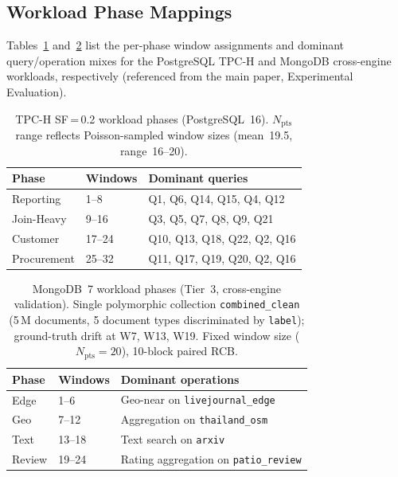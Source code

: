 \documentclass[10pt,twocolumn,a4paper]{article}
\newcommand{\Npts}{N_{\mathrm{pts}}}
\begin{document}
\subsection{Workload Phase Mappings}\label{supp:phases}

Tables~\ref{tab:phases-supp} and~\ref{tab:mongo-phases-supp} list the
per-phase window assignments and dominant query/operation mixes for the
PostgreSQL TPC-H and MongoDB cross-engine workloads, respectively
(referenced from the main paper, Experimental Evaluation).

\begin{table}[!htb]\centering\small
\caption{TPC-H SF\,=\,0.2 workload phases (PostgreSQL~16).
$\Npts$ range reflects Poisson-sampled window sizes
(mean~19.5, range~16--20).}\label{tab:phases-supp}
\begin{tabular}{@{}llp{3.5cm}@{}}
\toprule
\textbf{Phase} & \textbf{Windows} & \textbf{Dominant queries}\\
\midrule
Reporting & 1--8 & Q1, Q6, Q14, Q15, Q4, Q12\\
Join-Heavy & 9--16 & Q3, Q5, Q7, Q8, Q9, Q21\\
Customer & 17--24 & Q10, Q13, Q18, Q22, Q2, Q16\\
Procurement & 25--32 & Q11, Q17, Q19, Q20, Q2, Q16\\
\bottomrule
\end{tabular}
\end{table}

\begin{table}[!htb]\centering\small
\caption{MongoDB~7 workload phases (Tier~3, cross-engine validation).
Single polymorphic collection \texttt{combined\_clean} (5\,M documents,
5 document types discriminated by \texttt{label});
ground-truth drift at W7, W13, W19. Fixed window size
($\Npts\!=\!20$), 10-block paired RCB.}\label{tab:mongo-phases-supp}
\begin{tabular}{@{}llp{3.4cm}@{}}
\toprule
\textbf{Phase} & \textbf{Windows} & \textbf{Dominant operations}\\
\midrule
Edge        & 1--6   & Geo-near on \texttt{livejournal\_edge}\\
Geo         & 7--12  & Aggregation on \texttt{thailand\_osm}\\
Text        & 13--18 & Text search on \texttt{arxiv}\\
Review      & 19--24 & Rating aggregation on \texttt{patio\_review}\\
\bottomrule
\end{tabular}
\end{table}
\end{document}
